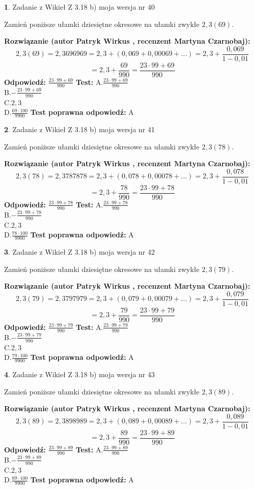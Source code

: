 \documentclass[12pt, a4paper]{article}
\theoremstyle{definition} %
\newtheorem{zad}{}
\newcommand{\zadStart}[1]{\begin{zad}#1\newline}
\newcommand{\zadStop}{\end{zad}}
\newcommand{\rozwStart}[2]{\noindent \textbf{Rozwiązanie (autor #1 , recenzent #2): }\newline}
\newcommand{\rozwStop}{\newline}
\newcommand{\odpStart}{\noindent \textbf{Odpowiedź:}\newline}
\newcommand{\odpStop}{\newline}
\newcommand{\testStart}{\noindent \textbf{Test:}\newline}
\newcommand{\testStop}{\newline}
\newcommand{\kluczStart}{\noindent \textbf{Test poprawna odpowiedź:}\newline}
\newcommand{\kluczStop}{\newline}
\begin{document}
\zadStart{Zadanie z Wikieł Z 3.18 b) moja wersja nr 40}

Zamień poniższe ułamki dziesiętne okresowe na ułamki zwykłe $2,3(69)$.
\zadStop
\rozwStart{Patryk Wirkus}{Martyna Czarnobaj}
$$2,3(69)=2,3696969=2,3+(0,069+0,00069+...)=2,3+\frac{0,069}{1-0,01}$$
$$=2,3+\frac{69}{990}=\frac{23\cdot99+69}{990}$$
\rozwStop
\odpStart
$\frac{23\cdot99+69}{990}$
\odpStop
\testStart
A.$\frac{23\cdot99+69}{990}$\\ B.$-\frac{23\cdot99+69}{990}$\\ C.$2,3$\\ D.$\frac{69\cdot100}{9900}$
\testStop
\kluczStart
A
\kluczStop



\zadStart{Zadanie z Wikieł Z 3.18 b) moja wersja nr 41}

Zamień poniższe ułamki dziesiętne okresowe na ułamki zwykłe $2,3(78)$.
\zadStop
\rozwStart{Patryk Wirkus}{Martyna Czarnobaj}
$$2,3(78)=2,3787878=2,3+(0,078+0,00078+...)=2,3+\frac{0,078}{1-0,01}$$
$$=2,3+\frac{78}{990}=\frac{23\cdot99+78}{990}$$
\rozwStop
\odpStart
$\frac{23\cdot99+78}{990}$
\odpStop
\testStart
A.$\frac{23\cdot99+78}{990}$\\ B.$-\frac{23\cdot99+78}{990}$\\ C.$2,3$\\ D.$\frac{78\cdot100}{9900}$
\testStop
\kluczStart
A
\kluczStop



\zadStart{Zadanie z Wikieł Z 3.18 b) moja wersja nr 42}

Zamień poniższe ułamki dziesiętne okresowe na ułamki zwykłe $2,3(79)$.
\zadStop
\rozwStart{Patryk Wirkus}{Martyna Czarnobaj}
$$2,3(79)=2,3797979=2,3+(0,079+0,00079+...)=2,3+\frac{0,079}{1-0,01}$$
$$=2,3+\frac{79}{990}=\frac{23\cdot99+79}{990}$$
\rozwStop
\odpStart
$\frac{23\cdot99+79}{990}$
\odpStop
\testStart
A.$\frac{23\cdot99+79}{990}$\\ B.$-\frac{23\cdot99+79}{990}$\\ C.$2,3$\\ D.$\frac{79\cdot100}{9900}$
\testStop
\kluczStart
A
\kluczStop



\zadStart{Zadanie z Wikieł Z 3.18 b) moja wersja nr 43}

Zamień poniższe ułamki dziesiętne okresowe na ułamki zwykłe $2,3(89)$.
\zadStop
\rozwStart{Patryk Wirkus}{Martyna Czarnobaj}
$$2,3(89)=2,3898989=2,3+(0,089+0,00089+...)=2,3+\frac{0,089}{1-0,01}$$
$$=2,3+\frac{89}{990}=\frac{23\cdot99+89}{990}$$
\rozwStop
\odpStart
$\frac{23\cdot99+89}{990}$
\odpStop
\testStart
A.$\frac{23\cdot99+89}{990}$\\ B.$-\frac{23\cdot99+89}{990}$\\ C.$2,3$\\ D.$\frac{89\cdot100}{9900}$
\testStop
\kluczStart
A
\kluczStop
\end{document}
